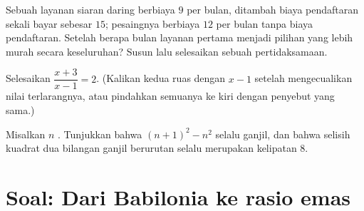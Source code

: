 \begin{exercise}[$\star\star$]\label{exo:g10:algebra:9}
Sebuah layanan siaran daring berbiaya $9$ per bulan, ditambah biaya
pendaftaran sekali bayar sebesar $15$; pesaingnya berbiaya $12$ per bulan
tanpa biaya pendaftaran. Setelah berapa bulan layanan pertama menjadi
pilihan yang lebih murah secara keseluruhan? Susun lalu selesaikan
sebuah pertidaksamaan.
\end{exercise}

\begin{exercise}[$\star\star$]\label{exo:g10:algebra:10}
Selesaikan $\dfrac{x+3}{x-1} = 2$. (Kalikan kedua ruas dengan $x - 1$ setelah
mengecualikan nilai terlarangnya, atau pindahkan semuanya ke kiri dengan
penyebut yang sama.)
\end{exercise}

\begin{exercise}[$\star\star\star$]\label{exo:g10:algebra:11}
Misalkan $n$ . Tunjukkan bahwa $(n + 1)^2 - n^2$ selalu ganjil,
dan bahwa selisih kuadrat dua bilangan ganjil berurutan selalu merupakan
kelipatan $8$.
\end{exercise}

\section{Soal: Dari Babilonia ke rasio emas}

